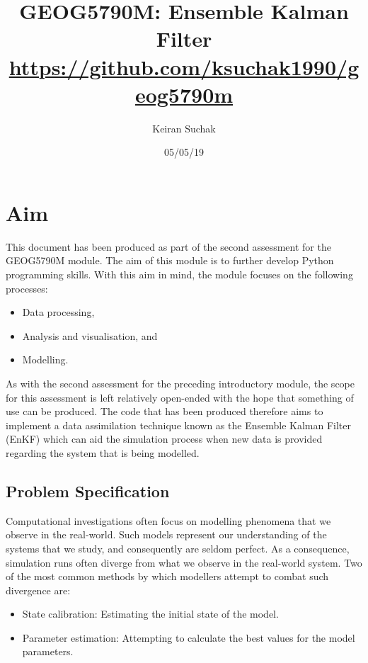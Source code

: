 \documentclass[a4paper, 12pt, twoside]{article}
\begin{document}
\title{GEOG5790M: Ensemble Kalman Filter \\
        \large \url{https://github.com/ksuchak1990/geog5790m}}

\author{Keiran Suchak}
\date{05/05/19}

\maketitle
\tableofcontents

\newpage
\section{Aim}\label{sec:aim}

This document has been produced as part of the second assessment for the
GEOG5790M module.
The aim of this module is to further develop Python programming skills.
With this aim in mind, the module focuses on the following processes:
\begin{itemize}
    \item Data processing,
    \item Analysis and visualisation, and
    \item Modelling.
\end{itemize}

As with the second assessment for the preceding introductory module, the scope
for this assessment is left relatively open-ended with the hope that something
of use can be produced.
The code that has been produced therefore aims to implement a data assimilation
technique known as the Ensemble Kalman Filter (EnKF) which can aid the
simulation process when new data is provided regarding the system that is being
modelled.

\subsection{Problem Specification}\label{sub:aim:problem}

Computational investigations often focus on modelling phenomena that we observe
in the real-world.
Such models represent our understanding of the systems that we study, and
consequently are seldom perfect.
As a consequence, simulation runs often diverge from what we observe in the
real-world system.
Two of the most common methods by which modellers attempt to combat such
divergence are:
\begin{itemize}
    \item State calibration: Estimating the initial state of the model.
    \item Parameter estimation: Attempting to calculate the best values for the
        model parameters.
\end{itemize}
\end{document}
